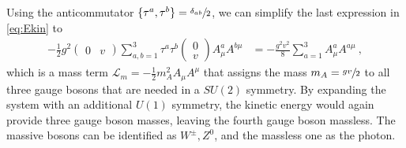 Using the anticommutator $\{\tau^a,\tau^b\}=\sfrac{\delta_{ab}}{2}$, we can simplify the last expression in \eqref{eq:Ekin} to
\begin{align}
	- \frac{1}{2}g^2\begin{pmatrix} 0 & v \end{pmatrix}\sum_{a,b=1}^{3}\tau^a\tau^b\begin{pmatrix} 0 \\ v \end{pmatrix}A_\mu^aA^{b\mu} &= - \frac{g^2v^2}{8}\sum_{a=1}^{3}A_\mu^aA^{a\mu} \ ,
\end{align}
which is a mass term $\mathcal{L}_m = -\frac{1}{2}m_A^2A_\mu A^\mu$ that assigns the mass $m_A = \sfrac{gv}{2}$ to all three gauge bosons that are needed in a $SU(2)$ symmetry. By expanding the system with an additional $U(1)$ symmetry, the kinetic energy would again provide three gauge boson masses, leaving the fourth gauge boson massless. The massive bosons can be identified as $W^\pm,Z^0$, and the massless one as the photon.


